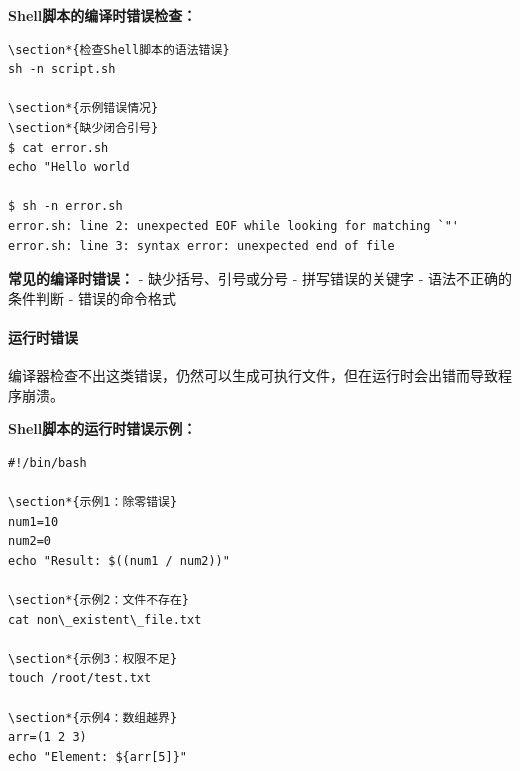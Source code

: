 \documentclass[12pt,UTF8]{ctexbook}
\begin{document}
\textbf{Shell脚本的编译时错误检查：}
\begin{verbatim}
\section*{检查Shell脚本的语法错误}
sh -n script.sh

\section*{示例错误情况}
\section*{缺少闭合引号}
$ cat error.sh
echo "Hello world

$ sh -n error.sh
error.sh: line 2: unexpected EOF while looking for matching `"'
error.sh: line 3: syntax error: unexpected end of file
\end{verbatim}

\textbf{常见的编译时错误：}
- 缺少括号、引号或分号
- 拼写错误的关键字
- 语法不正确的条件判断
- 错误的命令格式

\paragraph{运行时错误}
编译器检查不出这类错误，仍然可以生成可执行文件，但在运行时会出错而导致程序崩溃。

\textbf{Shell脚本的运行时错误示例：}
\begin{verbatim}
#!/bin/bash

\section*{示例1：除零错误}
num1=10
num2=0
echo "Result: $((num1 / num2))"

\section*{示例2：文件不存在}
cat non\_existent\_file.txt

\section*{示例3：权限不足}
touch /root/test.txt

\section*{示例4：数组越界}
arr=(1 2 3)
echo "Element: ${arr[5]}"
\end{verbatim}
\end{document}
